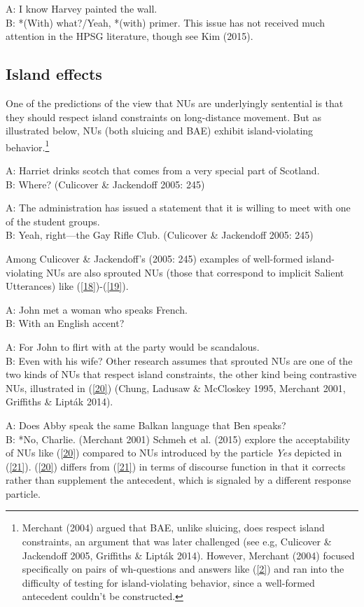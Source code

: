 \documentclass[output=paper]{langsci/langscibook}
\begin{document}
{ \ea A: I know Harvey painted the wall.\\B: *(With) what?/Yeah, *(with) primer.\label{15}\z
This issue has not received much attention in the HPSG literature, though see Kim (2015).


\subsection{Island effects}
One of the predictions of the view that NUs are underlyingly sentential is that they should respect island constraints on long-distance movement. But as illustrated below, NUs (both sluicing and BAE) exhibit island-violating behavior.\footnote{Merchant (2004) argued that BAE, unlike sluicing, does respect island constraints, an argument that was later challenged (see e.g, Culicover \& Jackendoff 2005, Griffiths \& Lipt\'{a}k 2014). However, Merchant (2004) focused specifically on pairs of wh-questions and answers like (\ref{2}) and ran into the difficulty of testing for island-violating behavior, since a well-formed antecedent couldn't be constructed.}

\ea A: Harriet drinks scotch that comes from a very special part of Scotland.\\B: Where? (Culicover \& Jackendoff 2005: 245) \label{16}\z

\ea A: The administration has issued a statement that it is willing to meet with one of the student groups.\\B: Yeah, right---the Gay Rifle Club. (Culicover \& Jackendoff 2005: 245) \label{17}\z

Among Culicover \& Jackendoff's (2005: 245) examples of well-formed island-violating NUs are also sprouted NUs (those that correspond to implicit Salient Utterances) like (\ref{18})-(\ref{19}).

\ea A: John met a woman who speaks French.\\B: With an English accent?\label{18}\z

\ea A: For John to flirt with at the party would be scandalous. \\B: Even with his wife?\label{19}\z
Other research assumes that sprouted NUs are one of the two kinds of NUs that respect island constraints, the other kind being contrastive NUs, illustrated in (\ref{20}) (Chung,
Ladusaw \& McCloskey 1995, Merchant 2001, Griffiths \& Lipt\'{a}k 2014).

\ea A: Does Abby speak the same Balkan language that Ben speaks?\\B: *No, Charlie. (Merchant 2001)  \label{20}\z
 Schmeh et al. (2015) explore the acceptability of NUs like (\ref{20}) compared to NUs introduced by the particle {\it Yes} depicted in (\ref{21}). (\ref{20}) differs from (\ref{21}) in terms of discourse function in that it corrects rather than supplement the antecedent, which is signaled by a different response particle.

}
\end{document}
